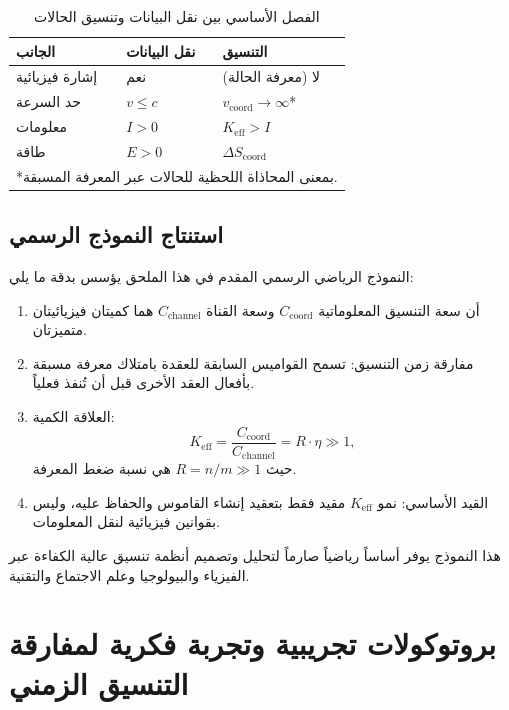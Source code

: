 \documentclass[11pt,a4paper]{article}
\begin{document}
	\begin{table}[htbp]
		\centering
		\caption{الفصل الأساسي بين نقل البيانات وتنسيق الحالات}
		\label{tab:separation}
		\begin{tabular}{lp{6cm}p{6cm}}
			\toprule
			\textbf{الجانب} & \textbf{نقل البيانات} & \textbf{التنسيق} \\
			\midrule
			إشارة فيزيائية & نعم & لا (معرفة الحالة) \\
			حد السرعة & $v \leq c$ & $v_{\text{coord}} \to \infty$* \\
			معلومات & $I > 0$ & $K_{\text{eff}} > I$ \\
			طاقة & $E > 0$ & $\Delta S_{\text{coord}}$ \\
			\bottomrule
			\multicolumn{3}{l}{*بمعنى المحاذاة اللحظية للحالات عبر المعرفة المسبقة.}
		\end{tabular}
	\end{table}
	
	\subsection{استنتاج النموذج الرسمي}
	
	النموذج الرياضي الرسمي المقدم في هذا الملحق يؤسس بدقة ما يلي:
	
	\begin{enumerate}
		\item أن سعة التنسيق المعلوماتية $C_{\text{coord}}$ وسعة القناة $C_{\text{channel}}$ هما كميتان فيزيائيتان متميزتان.
		
		\item مفارقة زمن التنسيق: تسمح القواميس السابقة للعقدة بامتلاك معرفة مسبقة بأفعال العقد الأخرى قبل أن تُنفذ فعلياً.
		
		\item العلاقة الكمية:
		\[
		K_{\mathrm{eff}} = \frac{C_{\text{coord}}}{C_{\text{channel}}} = R \cdot \eta \gg 1,
		\]
		حيث $R = n/m \gg 1$ هي نسبة ضغط المعرفة.
		
		\item القيد الأساسي: نمو $K_{\mathrm{eff}}$ مقيد فقط بتعقيد إنشاء القاموس والحفاظ عليه، وليس بقوانين فيزيائية لنقل المعلومات.
	\end{enumerate}
	
	هذا النموذج يوفر أساساً رياضياً صارماً لتحليل وتصميم أنظمة تنسيق عالية الكفاءة عبر الفيزياء والبيولوجيا وعلم الاجتماع والتقنية.
	
	
	\section{بروتوكولات تجريبية وتجربة فكرية لمفارقة التنسيق الزمني}
	\label{app:experimental-protocols}
	
\end{document}
